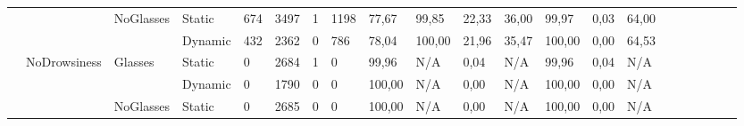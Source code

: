 \documentclass[12pt]{article}
\begin{document}
\begin{landscape}
\begin{table}[]
\begin{adjustbox}{width=1.4\textwidth}
\begin{tabular}{lllllllllllllllccllll}
				\multicolumn{1}{|l|}{} & \multicolumn{1}{l|}{} & \multicolumn{1}{l|}{\multirow{2}{*}{NoGlasses}} & \multicolumn{1}{l|}{Static}  & \multicolumn{1}{l|}{674} & \multicolumn{1}{l|}{3497} & \multicolumn{1}{l|}{1} & \multicolumn{1}{l|}{1198} & \multicolumn{1}{l|}{77,67} & \multicolumn{1}{l|}{99,85} & \multicolumn{1}{l|}{22,33} & \multicolumn{1}{l|}{36,00} & \multicolumn{1}{l|}{99,97} & \multicolumn{1}{l|}{0,03} & \multicolumn{1}{l|}{64,00} & \multicolumn{1}{c|}{} & \multicolumn{1}{c|}{} & \multicolumn{1}{l|}{} & \multicolumn{1}{l|}{} & \multicolumn{1}{l|}{} & \multicolumn{1}{l|}{}\\ \cline{4-15}
				\multicolumn{1}{|l|}{} & \multicolumn{1}{l|}{} & \multicolumn{1}{l|}{} & \multicolumn{1}{l|}{Dynamic} & \multicolumn{1}{l|}{432} & \multicolumn{1}{l|}{2362} & \multicolumn{1}{l|}{0} & \multicolumn{1}{l|}{786} & \multicolumn{1}{l|}{78,04} & \multicolumn{1}{l|}{100,00} & \multicolumn{1}{l|}{21,96} & \multicolumn{1}{l|}{35,47} & \multicolumn{1}{l|}{100,00} & \multicolumn{1}{l|}{0,00} & \multicolumn{1}{l|}{64,53} & \multicolumn{1}{c|}{} & \multicolumn{1}{c|}{} & \multicolumn{1}{l|}{} & \multicolumn{1}{l|}{} & \multicolumn{1}{l|}{} & \multicolumn{1}{l|}{} \\ \cline{2-15}
				\multicolumn{1}{|l|}{} & \multicolumn{1}{l|}{\multirow{4}{*}{NoDrowsiness}} & \multicolumn{1}{l|}{\multirow{2}{*}{Glasses}} & \multicolumn{1}{l|}{Static} & \multicolumn{1}{l|}{0} & \multicolumn{1}{l|}{2684} & \multicolumn{1}{l|}{1} & \multicolumn{1}{l|}{0} & \multicolumn{1}{l|}{99,96} & \multicolumn{1}{l|}{N/A} & \multicolumn{1}{l|}{0,04} & \multicolumn{1}{l|}{N/A} & \multicolumn{1}{l|}{99,96} & \multicolumn{1}{l|}{0,04} & \multicolumn{1}{l|}{N/A} & \multicolumn{1}{c|}{} & \multicolumn{1}{c|}{} & \multicolumn{1}{l|}{} & \multicolumn{1}{l|}{} & \multicolumn{1}{l|}{} & \multicolumn{1}{l|}{}\\ \cline{4-15}
				\multicolumn{1}{|l|}{} & \multicolumn{1}{l|}{} & \multicolumn{1}{l|}{} & \multicolumn{1}{l|}{Dynamic} & \multicolumn{1}{l|}{0} & \multicolumn{1}{l|}{1790} & \multicolumn{1}{l|}{0} & \multicolumn{1}{l|}{0} & \multicolumn{1}{l|}{100,00} & \multicolumn{1}{l|}{N/A} & \multicolumn{1}{l|}{0,00} & \multicolumn{1}{l|}{N/A} & \multicolumn{1}{l|}{100,00} & \multicolumn{1}{l|}{0,00} & \multicolumn{1}{l|}{N/A} & \multicolumn{1}{c|}{} & \multicolumn{1}{c|}{} & \multicolumn{1}{l|}{} & \multicolumn{1}{l|}{} & \multicolumn{1}{l|}{} & \multicolumn{1}{l|}{}\\ \cline{3-15}
				\multicolumn{1}{|l|}{} & \multicolumn{1}{l|}{} & \multicolumn{1}{l|}{\multirow{2}{*}{NoGlasses}} & \multicolumn{1}{l|}{Static} & \multicolumn{1}{l|}{0} & \multicolumn{1}{l|}{2685} & \multicolumn{1}{l|}{0} & \multicolumn{1}{l|}{0} & \multicolumn{1}{l|}{100,00} & \multicolumn{1}{l|}{N/A} & \multicolumn{1}{l|}{0,00} & \multicolumn{1}{l|}{N/A} & \multicolumn{1}{l|}{100,00} & \multicolumn{1}{l|}{0,00} & \multicolumn{1}{l|}{N/A} & \multicolumn{1}{c|}{} & \multicolumn{1}{c|}{} & \multicolumn{1}{l|}{} & \multicolumn{1}{l|}{} & \multicolumn{1}{l|}{} & \multicolumn{1}{l|}{} \\ \cline{4-15}

\end{tabular}
\end{adjustbox}
\end{table}
\end{landscape}
\end{document}
